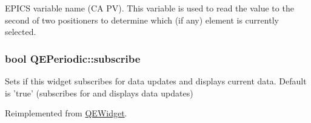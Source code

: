 \label{classQEPeriodic_ae191db70db9660bc253126a7b33d1f76}
EPICS variable name (CA PV). This variable is used to read the value to the second of two positioners to determine which (if any) element is currently selected. \hypertarget{classQEPeriodic_aa066c1f6f40a4cca7b822371a332f013}{
\subsubsection[{subscribe}]{\setlength{\rightskip}{0pt plus 5cm}bool QEPeriodic::subscribe}}
\label{classQEPeriodic_aa066c1f6f40a4cca7b822371a332f013}
Sets if this widget subscribes for data updates and displays current data. Default is 'true' (subscribes for and displays data updates) 

Reimplemented from \hyperlink{classQEWidget}{QEWidget}.

